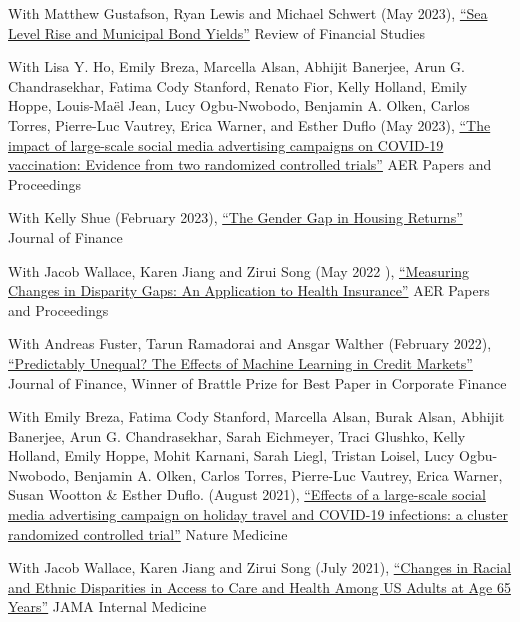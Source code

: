 \documentclass[letterpaper]{article}
\renewenvironment{itemize}{
  \begin{list}{}
    { \setlength{\itemsep}{5pt}
      \setlength{\parsep}{0pt}
      \setlength{\topsep}{0pt}
      \setlength{\leftmargin}{0em} } }{
  \end{list}}
\begin{document}
\begin{itemize}
\item With Matthew Gustafson, Ryan Lewis and Michael Schwert (May 2023), \href{http://paulgp.github.io/papers/ggls_munis.pdf}{``Sea Level Rise and Municipal Bond Yields''} Review of Financial Studies
\item With Lisa Y. Ho, Emily Breza, Marcella Alsan, Abhijit Banerjee, Arun G. Chandrasekhar, Fatima Cody Stanford, Renato Fior, Kelly Holland, Emily Hoppe, Louis-Maël Jean, Lucy Ogbu-Nwobodo, Benjamin A. Olken, Carlos Torres, Pierre-Luc Vautrey, Erica Warner, and Esther Duflo (May 2023), \href{https://paulgp.github.io/papers/submission_manuscript_appendix_social_media_covid_vaccines.pdf}{``The impact of large-scale social media advertising campaigns on COVID-19 vaccination: Evidence from two randomized controlled trials''} AER Papers and Proceedings
\item With Kelly Shue (February 2023), \href{https://paulgp.github.io/papers/Gender_Gap_in_Housing_Returns.pdf}{``The Gender Gap in Housing Returns''} Journal of Finance
\item  With Jacob Wallace, Karen Jiang and Zirui Song (May 2022 ), \href{https://paulgp.github.io/papers/aerpp_medicare.pdf}{``Measuring Changes in Disparity Gaps: An Application to Health Insurance''} AER Papers and Proceedings
\item With Andreas Fuster, Tarun Ramadorai and Ansgar Walther (February 2022), \href{https://papers.ssrn.com/sol3/papers.cfm?abstract_id=3072038}{``Predictably Unequal? The Effects of Machine Learning in Credit Markets''} Journal of Finance, Winner of Brattle Prize for Best Paper in Corporate Finance
\item With Emily Breza, Fatima Cody Stanford, Marcella Alsan, Burak Alsan, Abhijit Banerjee, Arun G. Chandrasekhar, Sarah Eichmeyer, Traci Glushko, Kelly Holland, Emily Hoppe, Mohit Karnani, Sarah Liegl, Tristan Loisel, Lucy Ogbu-Nwobodo, Benjamin A. Olken, Carlos Torres, Pierre-Luc Vautrey, Erica Warner, Susan Wootton \& Esther Duflo. (August 2021), \href{https://www.nature.com/articles/s41591-021-01487-3.pdf}{``Effects of a large-scale social media advertising campaign on holiday travel and COVID-19 infections: a cluster randomized controlled trial''} Nature Medicine  
\item With Jacob Wallace, Karen Jiang and Zirui Song (July 2021), \href{https://jamanetwork.com/journals/jamainternalmedicine/article-abstract/2782345}{``Changes in Racial and Ethnic Disparities in Access to Care and Health Among US Adults at Age 65 Years''} JAMA Internal Medicine

\end{itemize}
\end{document}
